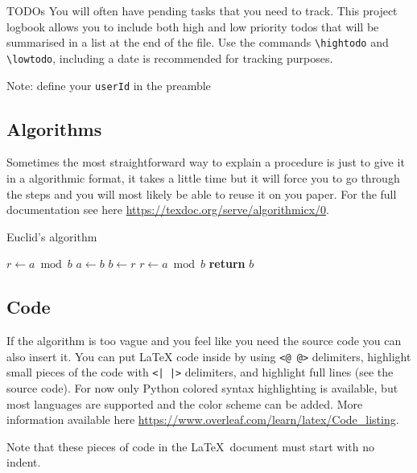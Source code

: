 \documentclass{project-logbook}
\begin{document}
		\begin{HighlightedNote}{TODOs}
			You will often have pending tasks that you need to track. This project logbook allows you to include both high and low priority todos that will be summarised in a list at the end of the file. Use the commands \texttt{\textbackslash hightodo} and \texttt{\textbackslash lowtodo}, including a date is recommended for tracking purposes.

			Note: define your \texttt{userId} in the preamble
		\end{HighlightedNote}





		\subsection{Algorithms} \label{sub:algorithms}

		\begin{HighlightedNote}{}
			Sometimes the most straightforward way to explain a procedure is just to give it in a algorithmic format, it takes a little time but it will force you to go through the steps and you will most likely be able to reuse it on you paper. For the full documentation see here \url{https://texdoc.org/serve/algorithmicx/0}.
		\end{HighlightedNote}

		\begin{algorithm}
			\caption{Euclid’s algorithm}\label{alg:euclid}
			\begin{algorithmic}[1]
					\State $r\gets a\bmod b$
						\State $a\gets b$
						\State $b\gets r$
						\State $r\gets a\bmod b$
					\EndWhile\label{euclidendwhile}
					\State \textbf{return} $b$
				\EndProcedure
			\end{algorithmic}
		\end{algorithm}


	\subsection{Code} \label{sub:code}
		\begin{HighlightedNote}{}
			If the algorithm is too vague and you feel like you need the source code you can also insert it. You can put LaTeX code inside by using \texttt{<@ @>} delimiters, highlight small pieces of the code with \texttt{<| |>} delimiters, and highlight full lines (see the source code). For now only Python colored syntax highlighting is available, but most languages are supported and the color scheme can be added. More information available here \url{https://www.overleaf.com/learn/latex/Code_listing}.

			Note that these pieces of code in the \LaTeX~document must start with no indent.
		\end{HighlightedNote}
\end{document}
